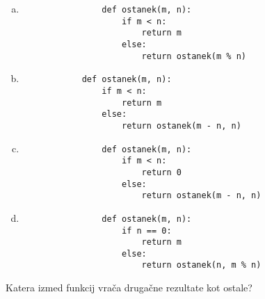 \documentclass[arhiv, 10pt]{../izpit}
\begin{document}
        \begin{multicols}{2}
        \begin{enumerate}[(a)]
\item 
                \begin{verbatim}
                def ostanek(m, n):
                    if m < n:
                        return m
                    else:
                        return ostanek(m % n)
                \end{verbatim}
            
\item 
            \begin{verbatim}
            def ostanek(m, n):
                if m < n:
                    return m
                else:
                    return ostanek(m - n, n)
            \end{verbatim}
        
\item 
                \begin{verbatim}
                def ostanek(m, n):
                    if m < n:
                        return 0
                    else:
                        return ostanek(m - n, n)
                \end{verbatim}
            
\item 
                \begin{verbatim}
                def ostanek(m, n):
                    if n == 0:
                        return m
                    else:
                        return ostanek(n, m % n)
                \end{verbatim}
            
\end{enumerate}

        \end{multicols}
    
        \naloga*
        
        Katera izmed funkcij vrača drugačne rezultate kot ostale?
    
\end{document}
